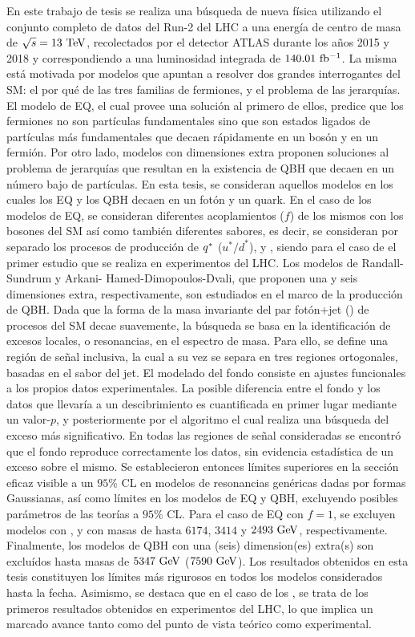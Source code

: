 En este trabajo de tesis se realiza una búsqueda de nueva física utilizando el conjunto completo de datos del Run-2 del \ac{LHC} a una energía de centro de masa de \(\sqs = 13~\tev\), recolectados por el detector \ac{ATLAS} durante los años 2015 y 2018 y correspondiendo a una luminosidad integrada de \(140.01~\ifb\). La misma está motivada por modelos que apuntan a resolver dos grandes interrogantes del \ac{SM}: el por qué de las tres familias de fermiones, y el problema de las jerarquías. El modelo de \acf{EQ}, el cual provee una solución al primero de ellos, predice que los fermiones no son partículas fundamentales sino que son estados ligados de partículas más fundamentales que decaen rápidamente en un bosón y en un fermión. Por otro lado, modelos con dimensiones extra proponen soluciones al problema de jerarquías que resultan en la existencia de \acf{QBH} que decaen en un número bajo de partículas. En esta tesis, se consideran aquellos modelos en los cuales los \ac{EQ} y los \ac{QBH} decaen en un fotón y un quark. En el caso de los modelos de \ac{EQ}, se consideran diferentes acoplamientos (\(f\)) de los mismos con los bosones del \ac{SM} así como también diferentes sabores, es decir, se consideran por separado los procesos de producción de \(\qstar\) (\(u^*/d^*\)), \cstar y \bstar, siendo para el caso de \cstar el primer estudio que se realiza en experimentos del \ac{LHC}. Los modelos de Randall-Sundrum y Arkani- Hamed-Dimopoulos-Dvali, que proponen una y seis dimensiones extra, respectivamente, son estudiados en el marco de la producción de \ac{QBH}. Dada que la forma de la masa invariante del par fotón+jet (\myj) de procesos del \ac{SM} decae suavemente, la búsqueda se basa en la identificación de excesos locales, o resonancias, en el espectro de masa. Para ello, se define una región de señal inclusiva, la cual a su vez se separa en tres regiones ortogonales, basadas en el sabor del jet. El modelado del fondo consiste en ajustes funcionales a los propios datos experimentales. La posible diferencia entre el fondo y los datos que llevaría a un descibrimiento es cuantificada en primer lugar mediante un valor-\(p\), y posteriormente por el algoritmo \bh el cual realiza una búsqueda del exceso más significativo. En todas las regiones de señal consideradas se encontró que el fondo reproduce correctamente los datos, sin evidencia estadística de un exceso sobre el mismo. Se establecieron entonces límites superiores en la sección eficaz visible a un \(95\%\) \ac{CL} en modelos de resonancias genéricas dadas por formas Gaussianas, así como límites en los modelos de \ac{EQ} y \ac{QBH}, excluyendo posibles parámetros de las teorías a \(95\%\) \ac{CL}. Para el caso de \ac{EQ} con \(f = 1\), se excluyen modelos con \qstar, \cstar y \bstar con masas de hasta \(6174\), \(3414\) y \(2493~\gev\), respectivamente. Finalmente, los modelos de \ac{QBH} con una (seis) dimension(es) extra(s) son excluídos hasta masas de \(5347~\gev\) (\(7590~\gev\)). Los resultados obtenidos en esta tesis constituyen los límites más rigurosos en todos los modelos considerados hasta la fecha. Asimismo, se destaca que en el caso de los \cstar, se trata de los primeros resultados obtenidos en experimentos del \ac{LHC}, lo que implica un marcado avance tanto como del punto de vista teórico como experimental.
